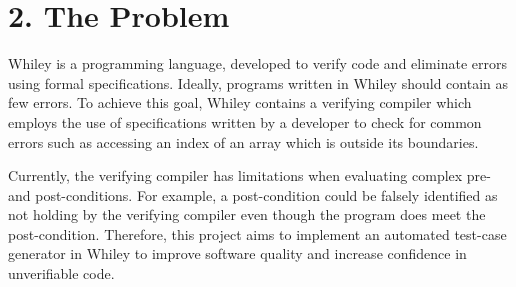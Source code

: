 \documentclass[11pt, a4paper, twoside, openright]{report}
\begin{document}
\section*{2. The Problem}
Whiley is a programming language, developed to verify code and eliminate errors using formal specifications. 
Ideally, programs written in Whiley should contain as few errors. 
To achieve this goal, Whiley contains a verifying compiler which employs the use of specifications written by a developer to check for common errors such as accessing an index of an array which is outside its boundaries.

Currently, the verifying compiler has limitations when evaluating complex pre- and post-conditions. 
For example, a post-condition could be falsely identified as not holding by the verifying compiler even though the program does meet the post-condition.
Therefore, this project aims to implement an automated test-case generator in Whiley to improve software quality  and increase confidence in unverifiable code.

%
%
%
%
\end{document}
